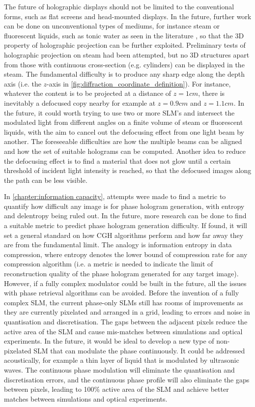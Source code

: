 The future of holographic displays should not be limited to the conventional forms, such as flat screens and head-mounted displays. In the future, further work can be done on unconventional types of mediums, for instance steam or fluorescent liquids, such as tonic water as seen in the literature \cite{Makowski2019}, so that the 3D property of holographic projection can be further exploited. Preliminary tests of holographic projection on steam had been attempted, but no 3D structures apart from those with continuous cross-section (e.g. cylinders) can be displayed in the steam. The fundamental difficulty is to produce any sharp edge along the depth axis (i.e. the $z$-axis in \cref{fig:diffraction_coordinate_definition}). For instance, whatever the content is to be projected at a distance of $z=1cm$, there is inevitably a defocused copy nearby for example at $z=0.9cm$ and $z=1.1cm$. In the future, it could worth trying to use two or more SLM's and intersect the modulated light from different angles on a finite volume of steam or fluorescent liquids, with the aim to cancel out the defocusing effect from one light beam by another. The foreseeable difficulties are how the multiple beams can be aligned and how the set of suitable holograms can be computed. Another idea to reduce the defocusing effect is to find a material that does not glow until a certain threshold of incident light intensity is reached, so that the defocused images along the path can be less visible.

In \cref{chapter:information capacity}, attempts were made to find a metric to quantify how difficult any image is for phase hologram generation, with entropy and delentropy being ruled out. In the future, more research can be done to find a suitable metric to predict phase hologram generation difficulty. If found, it will set a general standard on how CGH algorithms perform and how far away they are from the fundamental limit. The analogy is information entropy in data compression, where entropy denotes the lower bound of compression rate for any compression algorithm (i.e. a metric is needed to indicate the limit of reconstruction quality of the phase hologram generated for any target image). However, if a fully complex modulator could be built in the future, all the issues with phase retrieval algorithms can be avoided. Before the invention of a fully complex SLM, the current phase-only SLMs still has rooms of improvements as they are currently pixelated and arranged in a grid, leading to errors and noise in quantisation and discretisation. The gaps between the adjacent pixels reduce the active area of the SLM and cause mis-matches between simulations and optical experiments. In the future, it would be ideal to develop a new type of non-pixelated SLM that can modulate the phase continuously. It could be addressed acoustically, for example a thin layer of liquid that is modulated by ultrasonic waves. The continuous phase modulation will eliminate the quantisation and discretisation errors, and the continuous phase profile will also eliminate the gaps between pixels, leading to 100\% active area of the SLM and achieve better matches between simulations and optical experiments.